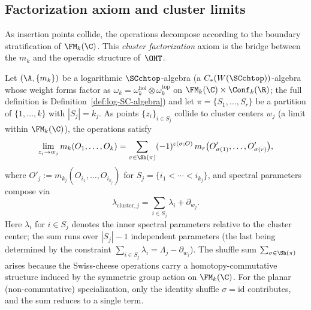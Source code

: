 \subsection{Factorization axiom and cluster limits}

As insertion points collide, the operations decompose according to the boundary stratification of $\FM_k(\C)$. This \emph{cluster factorization} axiom is the bridge between the $m_k$ and the operadic structure of~$\OHT$.

\begin{theorem}
\label{thm:cluster_factorization_homotopy}
Let $(\A, \{m_k\})$ be a logarithmic $\SCchtop$-algebra (a $C_\ast(W(\SCchtop))$-algebra whose weight forms factor as $\omega_k = \omega_k^{\mathrm{hol}} \otimes \omega_k^{\mathrm{top}}$ on $\FM_k(\C) \times \Conf_k(\R)$; the full definition is Definition~\ref{def:log-SC-algebra}) and let $\pi = \{S_1,\ldots,S_r\}$ be a partition of $\{1,\ldots,k\}$ with $|S_j| = k_j$. As points $\{z_i\}_{i \in S_j}$ collide to cluster centers $w_j$ (a limit within $\FM_k(\C)$), the operations satisfy
\begin{equation}
\label{eq:cluster_factorization}
\lim_{z_i \to w_j} m_k(O_1,\ldots,O_k) = \sum_{\sigma \in \Sh(\pi)} (-1)^{\varepsilon(\sigma;O)} \, m_r\big(O'_{\sigma(1)},\ldots,O'_{\sigma(r)}\big),
\end{equation}
where $O'_j := m_{k_j}(O_{i_1},\ldots,O_{i_{k_j}})$ for $S_j = \{i_1 < \cdots < i_{k_j}\}$, and spectral parameters compose via
\begin{equation}
\label{eq:spectral_composition}
\lambda_{\text{cluster},j} = \sum_{i \in S_j} \lambda_i + \partial_{w_j}.
\end{equation}
Here $\lambda_i$ for $i \in S_j$ denotes the inner spectral parameters relative to the cluster center; the sum runs over $|S_j| - 1$ independent parameters (the last being determined by the constraint $\sum_{i \in S_j} \lambda_i = \Lambda_j - \partial_{w_j}$).
The shuffle sum $\sum_{\sigma\in\Sh(\pi)}$ arises because the Swiss-cheese
operations carry a homotopy-commutative structure induced by the symmetric
group action on $\FM_k(\C)$. For the planar (non-commutative) specialization,
only the identity shuffle $\sigma=\mathrm{id}$ contributes, and the sum
reduces to a single term.
\end{theorem}


